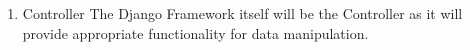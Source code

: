 \documentclass[a4paper,12pt]{article}
\begin{document}
\begin{itemize}
\begin{enumerate}
\item{Controller}
\newline
The Django Framework itself will be the Controller as it will provide appropriate functionality for data manipulation.

\subsubsection{}

\end{enumerate}
\end{itemize}
\end{document}
